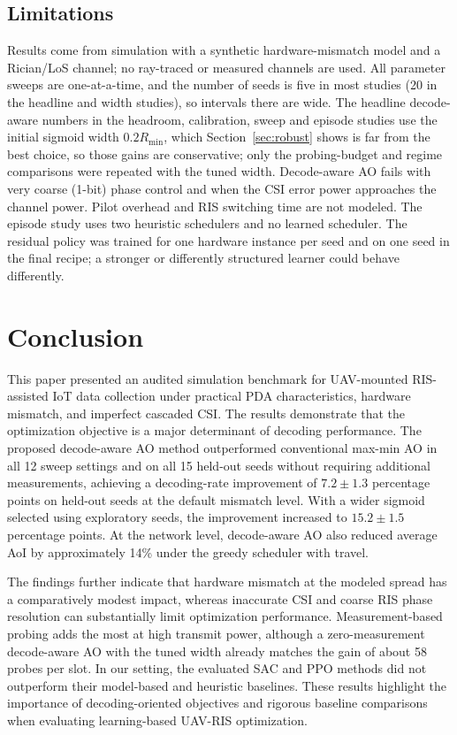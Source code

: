 \documentclass[journal]{IEEEtran}
\begin{document}
\subsection{Limitations}
\label{sec:limits}
Results come from simulation with a synthetic hardware-mismatch model and a Rician/LoS channel; no ray-traced or measured channels are used. All parameter sweeps are one-at-a-time, and the number of seeds is five in most studies (20 in the headline and width studies), so intervals there are wide. The headline decode-aware numbers in the headroom, calibration, sweep and episode studies use the initial sigmoid width $0.2R_{\min}$, which Section~\ref{sec:robust} shows is far from the best choice, so those gains are conservative; only the probing-budget and regime comparisons were repeated with the tuned width. Decode-aware AO fails with very coarse (1-bit) phase control and when the CSI error power approaches the channel power. Pilot overhead and RIS switching time are not modeled. The episode study uses two heuristic schedulers and no learned scheduler. The residual policy was trained for one hardware instance per seed and on one seed in the final recipe; a stronger or differently structured learner could behave differently.

\FloatBarrier
\section{Conclusion}
\label{sec:conclusion}

This paper presented an audited simulation benchmark for UAV-mounted RIS-assisted IoT data collection under practical PDA characteristics, hardware mismatch, and imperfect cascaded CSI. The results demonstrate that the optimization objective is a major determinant of decoding performance. The proposed decode-aware AO method outperformed conventional max-min AO in all 12 sweep settings and on all 15 held-out seeds without requiring additional measurements, achieving a decoding-rate improvement of $7.2\pm1.3$ percentage points on held-out seeds at the default mismatch level. With a wider sigmoid selected using exploratory seeds, the improvement increased to $15.2\pm1.5$ percentage points. At the network level, decode-aware AO also reduced average AoI by approximately 14\% under the greedy scheduler with travel.

The findings further indicate that hardware mismatch at the modeled spread has a comparatively modest impact, whereas inaccurate CSI and coarse RIS phase resolution can substantially limit optimization performance. Measurement-based probing adds the most at high transmit power, although a zero-measurement decode-aware AO with the tuned width already matches the gain of about 58 probes per slot. In our setting, the evaluated SAC and PPO methods did not outperform their model-based and heuristic baselines. These results highlight the importance of decoding-oriented objectives and rigorous baseline comparisons when evaluating learning-based UAV-RIS optimization.
\end{document}
